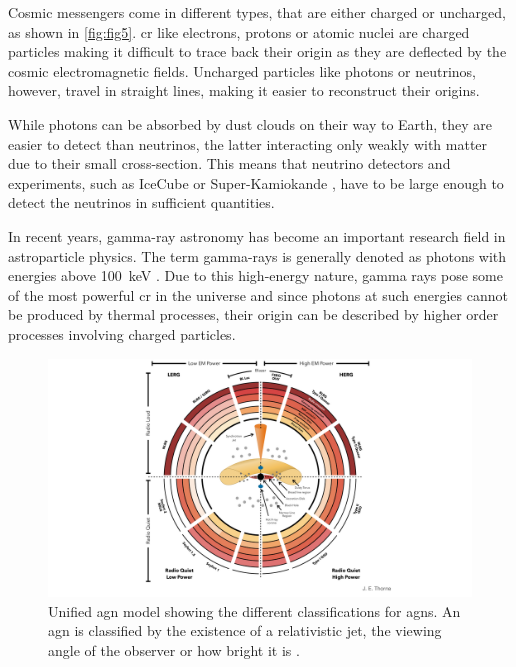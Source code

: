 Cosmic messengers come in different types, that are either charged or uncharged, as shown in \autoref{fig:fig5}.
\gls{cr} like electrons, protons or atomic nuclei are charged particles making it difficult to trace back their origin
as they are deflected by the cosmic electromagnetic fields. Uncharged particles like photons or
neutrinos, however, travel in straight lines, making it easier to reconstruct their origins.

While photons can be absorbed by dust clouds on their way to Earth, they are easier to detect than
neutrinos, the latter interacting only weakly with matter due to their small cross-section.
This means that neutrino detectors and experiments, such as IceCube \cite{icecube_2006} or
Super-Kamiokande \cite{kamiokande}, have to be large enough to detect the neutrinos in sufficient quantities.

In recent years, gamma-ray astronomy has become an important research field in astroparticle physics.
The term gamma-rays is generally denoted as photons with energies above \SI{100}{\kilo\eV}
\cite{funk}. Due to this high-energy nature, gamma rays pose some of the most powerful \gls{cr} in
the universe and since photons at such energies cannot be produced by thermal processes, their origin
can be described by higher order processes involving charged particles.

\begin{figure}
    \centering
    \includegraphics[width=\textwidth]{graphics/agn.pdf}
    \caption{Unified \gls{agn} model showing the different classifications for \glspl{agn}.
    An \gls{agn} is classified by the existence of a relativistic jet, the viewing angle of the observer
    or how bright it is \cite{agn_diagram}.}
    \label{fig:agn}
\end{figure}

